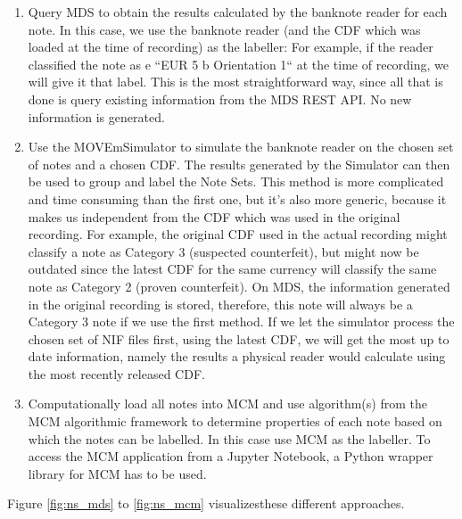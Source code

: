 \begin{enumerate}
\item Query MDS to obtain the results calculated by the banknote reader for each note. In this case, we use the banknote reader (and the CDF which was loaded at the time of recording) as the labeller: For example, if the reader classified the note as e ``EUR 5 b Orientation 1`` at the time of recording, we will give it that label. This is the most straightforward way, since all that is done is query existing information from the MDS REST API. No new information is generated.
\item Use the MOVEmSimulator to simulate the banknote reader on the chosen set of notes and a chosen CDF. The results generated by the Simulator can then be used to group and label the Note Sets. This method is more complicated and time consuming than the first one, but it's also more generic, because it makes us independent from the CDF which was used in the original recording. For example, the original CDF used in the actual recording might classify a note as Category 3 (suspected counterfeit), but might now be outdated since the latest CDF for the same currency will classify the same note as Category 2 (proven counterfeit). On MDS, the information generated in the original recording is stored, therefore, this note will always be a Category 3 note if we use the first method. If we let the simulator process the chosen set of NIF files first, using the latest CDF, we will get the most up to date information, namely the results a physical reader would calculate using the most recently released CDF.
\item Computationally load all notes into MCM and use algorithm(s) from the MCM algorithmic framework to determine properties of each note based on which the notes can be labelled. In this case use MCM as the labeller. To access the MCM application from a Jupyter Notebook, a Python wrapper library for MCM has to be used.
\end{enumerate}
\par Figure \ref{fig:ns_mds} to \ref{fig:ns_mcm} visualizesthese different approaches.

